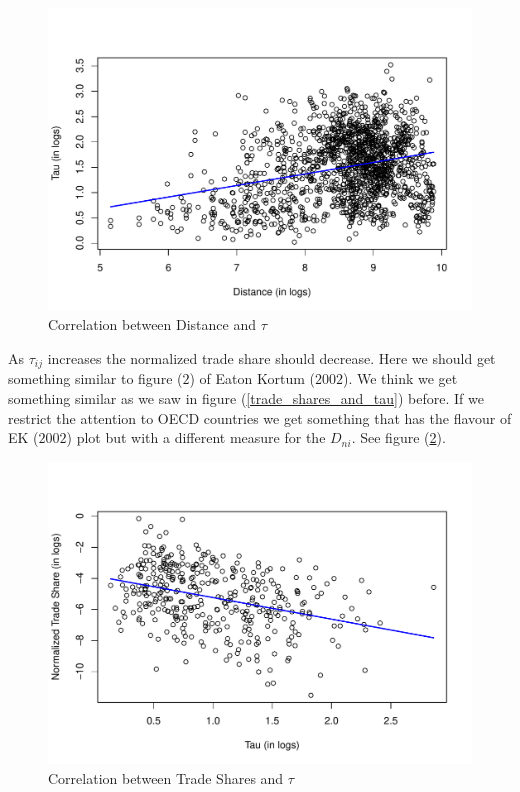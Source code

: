\documentclass[a4paper,12pt]{article}
\begin{document}
  \begin{figure}[htbp!]
     \centering
     \includegraphics[scale=0.75]{distance_and_tau_hat.pdf}
     \caption{Correlation between Distance and $\tau$}
     \label{distance_and_tau}
 \end{figure}
 
 As $\tau_{ij}$ increases the normalized trade share should decrease. Here we should get something similar to figure ($2$) of Eaton Kortum ($2002$). We think we get something similar as we saw in figure (\ref{trade_shares_and_tau}) before. If we restrict the attention to OECD countries we get something that has the flavour of EK ($2002$) plot but with a different measure for the $D_{ni}$. See figure (\ref{trade_shares_and_tau_only_OECD}). 

    
  \begin{figure}[htbp!]
     \centering
     \includegraphics[scale=0.75]{tau_and_norm_trade_share_OECD.pdf}
     \caption{Correlation between Trade Shares and $\tau$} 
     \label{trade_shares_and_tau_only_OECD}
 \end{figure}
 
\end{document}
